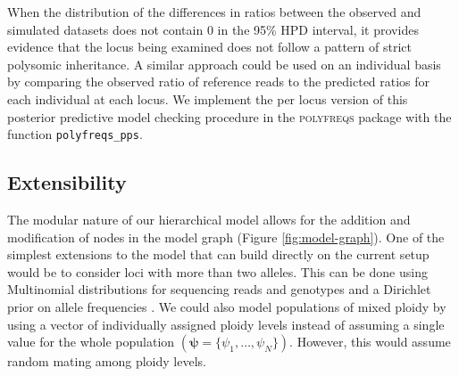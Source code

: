 \documentclass[11pt,english,letterpaper,oneside]{article}
\begin{document}
When the distribution of the differences in ratios between the observed and simulated datasets does not contain 0 in the 95\% HPD interval, it provides evidence that the locus being examined does not follow a pattern of strict polysomic inheritance. A similar approach could be used on an individual basis by comparing the observed ratio of reference reads to the predicted ratios for each individual at each locus. We implement the per locus version of this posterior predictive model checking procedure in the \textsc{polyfreqs} package with the function \texttt{polyfreqs\_pps}.

\medskip
\subsection*{Extensibility}
\medskip

The modular nature of our hierarchical model allows for the addition and modification of nodes in the model graph (Figure \ref{fig:model-graph}). One of the simplest extensions to the model that can build directly on the current setup would be to consider loci with more than two alleles. This can be done using Multinomial distributions for sequencing reads and genotypes and a Dirichlet prior on allele frequencies \citep[the Multinomial and Dirichlet distributions form a conjugate family;][]{gelman2014bayesian}. We could also model populations of mixed ploidy by using a vector of individually assigned ploidy levels instead of assuming a single value for the whole population $(\bm{\psi} = \{\psi_1,\ldots,\psi_N\})$. However, this would assume random mating among ploidy levels.
\medskip
\end{document}
